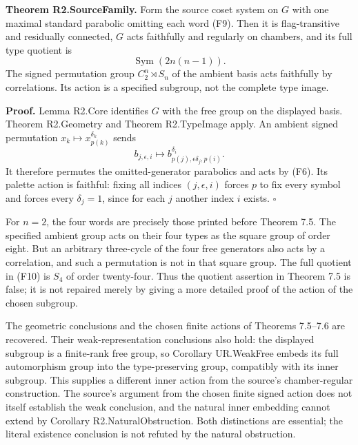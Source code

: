 \textbf{Theorem R2.SourceFamily.} Form the source coset system on \(G\)
with one maximal standard parabolic omitting each word (F9). Then it is
flag-transitive and residually connected, \(G\) acts faithfully and
regularly on chambers, and its full type quotient is \[
\operatorname{Sym}(2n(n-1)).
\tag{F10}
\] The signed permutation group \(C_2^n\rtimes S_n\) of the ambient
basis acts faithfully by correlations. Its action is a specified
subgroup, not the complete type image.

\textbf{Proof.} Lemma R2.Core identifies \(G\) with the free group on
the displayed basis. Theorem R2.Geometry and Theorem R2.TypeImage apply.
An ambient signed permutation \(x_k\mapsto x_{p(k)}^{\delta_k}\) sends
\[
b_{j,\epsilon,i}\longmapsto
b_{p(j),\epsilon\delta_j,p(i)}^{\delta_i}.
\tag{F11}
\] It therefore permutes the omitted-generator parabolics and acts by
(F6). Its palette action is faithful: fixing all indices
\((j,\epsilon,i)\) forces \(p\) to fix every symbol and forces every
\(\delta_j=1\), since for each \(j\) another index \(i\) exists.
\(\square\)

For \(n=2\), the four words are precisely those printed before Theorem
7.5. The specified ambient group acts on their four types as the square
group of order eight. But an arbitrary three-cycle of the four free
generators also acts by a correlation, and such a permutation is not in
that square group. The full quotient in (F10) is \(S_4\) of order
twenty-four. Thus the quotient assertion in Theorem 7.5 is false; it is
not repaired merely by giving a more detailed proof of the action of the
chosen subgroup.

The geometric conclusions and the chosen finite actions of Theorems
7.5--7.6 are recovered. Their weak-representation conclusions also hold:
the displayed subgroup is a finite-rank free group, so Corollary
UR.WeakFree embeds its full automorphism group into the type-preserving
group, compatibly with its inner subgroup. This supplies a different
inner action from the source's chamber-regular construction. The source's
argument from the chosen finite signed action does not itself establish
the weak conclusion, and the natural inner embedding cannot extend by
Corollary R2.NaturalObstruction. Both distinctions are essential; the
literal existence conclusion is not refuted by the natural obstruction.

